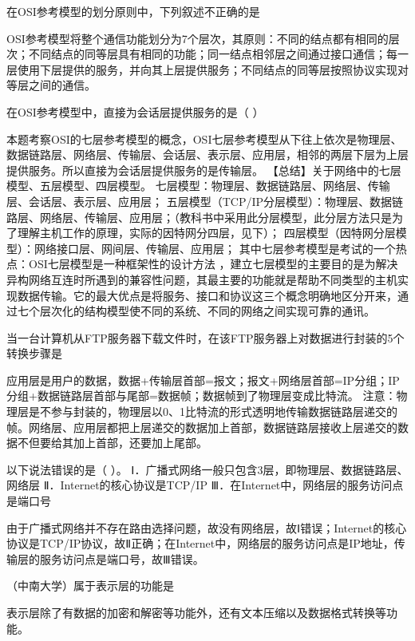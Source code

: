 \question 在OSI参考模型的划分原则中，下列叙述不正确的是
\par{}
\begin{solution}OSI参考模型将整个通信功能划分为7个层次，其原则：不同的结点都有相同的层次；不同结点的同等层具有相同的功能；同一结点相邻层之间通过接口通信；每一层使用下层提供的服务，并向其上层提供服务；不同结点的同等层按照协议实现对等层之间的通信。
\end{solution}
\question 在OSI参考模型中，直接为会话层提供服务的是（ ）
\par{}
\begin{solution}本题考察OSI的七层参考模型的概念，OSI七层参考模型从下往上依次是物理层、数据链路层、网络层、传输层、会话层、表示层、应用层，相邻的两层下层为上层提供服务。所以直接为会话层提供服务的是传输层。
【总结】关于网络中的七层模型、五层模型、四层模型。
七层模型：物理层、数据链路层、网络层、传输层、会话层、表示层、应用层；
五层模型（TCP/IP分层模型）：物理层、数据链路层、网络层、传输层、应用层；（教科书中采用此分层模型，此分层方法只是为了理解主机工作的原理，实际的因特网分四层，见下）；
四层模型（因特网分层模型）：网络接口层、网间层、传输层、应用层；
其中七层参考模型是考试的一个热点：OSI七层模型是一种框架性的设计方法
，建立七层模型的主要目的是为解决异构网络互连时所遇到的兼容性问题，其最主要的功能就是帮助不同类型的主机实现数据传输。它的最大优点是将服务、接口和协议这三个概念明确地区分开来，通过七个层次化的结构模型使不同的系统、不同的网络之间实现可靠的通讯。
\end{solution}
\question 当一台计算机从FTP服务器下载文件时，在该FTP服务器上对数据进行封装的5个转换步骤是
\par{}
\begin{solution}应用层是用户的数据，数据+传输层首部=报文；报文+网络层首部=IP分组；IP分组+数据链路层首部与尾部=数据帧；数据帧到了物理层变成比特流。
注意：物理层是不参与封装的，物理层以0、1比特流的形式透明地传输数据链路层递交的帧。网络层、应用层都把上层递交的数据加上首部，数据链路层接收上层递交的数据不但要给其加上首部，还要加上尾部。
\end{solution}
\question 以下说法错误的是（ ）。
Ⅰ．广播式网络一般只包含3层，即物理层、数据链路层、网络层
Ⅱ．Internet的核心协议是TCP/IP
Ⅲ．在Internet中，网络层的服务访问点是端口号
\par{}
\begin{solution}由于广播式网络并不存在路由选择问题，故没有网络层，故Ⅰ错误；Internet的核心协议是TCP/IP协议，故Ⅱ正确；在Internet中，网络层的服务访问点是IP地址，传输层的服务访问点是端口号，故Ⅲ错误。
\end{solution}
\question （中南大学）属于表示层的功能是
\par{}
\begin{solution}表示层除了有数据的加密和解密等功能外，还有文本压缩以及数据格式转换等功能。
\end{solution}
